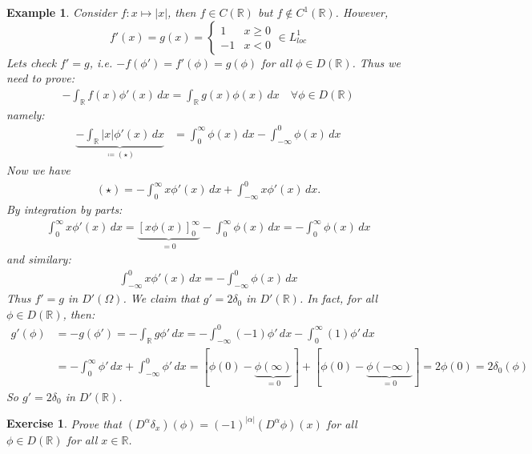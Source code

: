 \documentclass{report}
\theoremstyle{tommy}
\newtheorem{eg}[defn]{Example}
\newtheorem{ex}[defn]{Exercise}
\begin{document}
  \begin{eg}
    Consider \(f: x \mapsto |x|\), then \(f \in C(\mathbb{R})\) but \(f \notin C^1(\mathbb{R})\). However, 
    \[f'(x) = g(x) = \begin{cases}
      1 & x \ge 0 \\ -1 &x < 0
    \end{cases} \in L_{loc}^1\]
    Lets check \(f' = g\), i.e. \(-f(\phi') = f'(\phi) = g(\phi)\) for all \(\phi \in D(\mathbb{R})\). Thus we need to prove:
    \begin{align*}
      - \int_{\mathbb{R}} f(x) \phi'(x) \, dx = \int_{\mathbb{R}} g(x) \phi(x) \, dx \quad \forall \phi \in D(\mathbb{R})
    \end{align*}
    namely:
    \begin{align*}
      \underbrace{- \int_{\mathbb{R}} |x| \phi'(x) \, dx}_{\coloneqq (\star)} &= \int_0^\infty \phi(x) \, dx - \int_{-\infty}^0 \phi(x) \, dx
    \end{align*}
    Now we have
    \begin{align*}
      (\star) = - \int_0^\infty x \phi'(x) \, dx + \int_{-\infty}^0 x \phi'(x) \, dx.
    \end{align*}
    By integration by parts:
    \begin{align*}
      \int_0^\infty x \phi'(x) \, dx = \underbrace{[x \phi(x)]_0^\infty}_{= 0} - \int_0^\infty \phi(x) \, dx = - \int_0^\infty \phi(x) \, dx
    \end{align*}
    and similary:
    \begin{align*}
      \int_{-\infty}^0 x \phi'(x) \, dx = - \int_{-\infty}^0 \phi(x) \, dx
    \end{align*}
    Thus \(f' = g\) in \(D'(\Omega)\). We claim that \(g' = 2 \delta_0\) in \(D'(\mathbb{R})\). In fact, for all \(\phi \in D(\mathbb{R})\), then:
    \begin{align*}
      g'(\phi) 
      &= - g(\phi') 
      = - \int_{\mathbb{R}} g\phi' \, dx
      = - \int_{-\infty}^0 (-1) \phi'  \, dx - \int_0^\infty (1) \phi'  \, dx\\
      &= - \int_0^\infty \phi'  \, dx + \int_{-\infty}^0 \phi' \, dx
      = [\phi(0) - \underbrace{\phi(\infty)}_{= 0}] + [\phi(0) - \underbrace{\phi(-\infty)}_{= 0}]
      = 2 \phi(0) = 2 \delta_0 (\phi)
    \end{align*}
    So \(g' = 2 \delta_0\) in \(D'(\mathbb{R})\).
  \end{eg}

  \begin{ex}
    Prove that \((D^\alpha \delta_x)(\phi) = (-1)^{|\alpha|}(D^\alpha \phi)(x)\) for all \(\phi \in D(\mathbb{R})\) for all \(x \in \mathbb{R}\).
  \end{ex}
\end{document}
